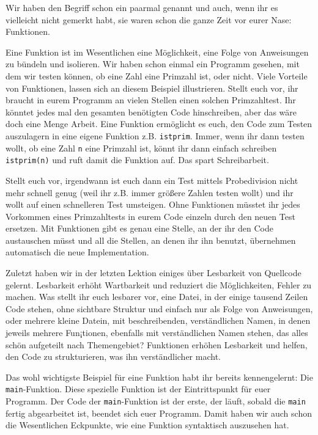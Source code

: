 
Wir haben den Begriff schon ein paarmal genannt und auch, wenn ihr es
vielleicht nicht gemerkt habt, sie waren schon die ganze Zeit vor eurer Nase:
Funktionen.

Eine Funktion ist im Wesentlichen eine Möglichkeit, eine Folge von Anweisungen
zu bündeln und isolieren. Wir haben schon einmal ein Programm gesehen, mit dem
wir testen können, ob eine Zahl eine Primzahl ist, oder nicht. Viele Vorteile
von Funktionen, lassen sich an diesem Beispiel illustrieren. Stellt euch vor,
ihr braucht in eurem Programm an vielen Stellen einen solchen Primzahltest. Ihr
könntet jedes mal den gesamten benötigten Code hinschreiben, aber das wäre doch
eine Menge Arbeit. Eine Funktion ermöglicht es euch, den Code zum Testen
auszulagern in eine eigene Funktion z.B. \texttt{istprim}. Immer, wenn ihr dann
testen wollt, ob eine Zahl \texttt{n} eine Primzahl ist, könnt ihr dann einfach
schreiben \texttt{istprim(n)} und ruft damit die Funktion auf. Das spart
Schreibarbeit.

Stellt euch vor, irgendwann ist euch dann ein Test mittels Probedivision nicht
mehr schnell genug (weil ihr z.B. immer größere Zahlen testen wollt) und ihr
wollt auf einen schnelleren Test umsteigen. Ohne Funktionen müsstet ihr jedes
Vorkommen eines Primzahltests in eurem Code einzeln durch den neuen Test
ersetzen. Mit Funktionen gibt es genau eine Stelle, an der ihr den Code
austauschen müsst und all die Stellen, an denen ihr ihn benutzt, übernehmen
automatisch die neue Implementation.

Zuletzt haben wir in der letzten Lektion einiges über Lesbarkeit von Quellcode
gelernt. Lesbarkeit erhöht Wartbarkeit und reduziert die Möglichkeiten, Fehler
zu machen. Was stellt ihr euch lesbarer vor, eine Datei, in der einige tausend
Zeilen Code stehen, ohne sichtbare Struktur und einfach nur als Folge von
Anweisungen, oder mehrere kleine Datein, mit beschreibenden, verständlichen
Namen, in denen jeweils mehrere Fun¡tionen, ebenfalls mit verständlichen Namen
stehen, das alles schön aufgeteilt nach Themengebiet? Funktionen erhöhen
Lesbarkeit und helfen, den Code zu strukturieren, was ihn verständlicher macht.

Das wohl wichtigste Beispiel für eine Funktion habt ihr bereits kennengelernt:
Die \texttt{main}-Funktion. Diese spezielle Funktion ist der Eintrittspunkt für
euer Programm. Der Code der \texttt{main}-Funktion ist der erste, der läuft,
sobald die \texttt{main} fertig abgearbeitet ist, beendet sich euer Programm.
Damit haben wir auch schon die Wesentlichen Eckpunkte, wie eine Funktion
syntaktisch auszusehen hat.

